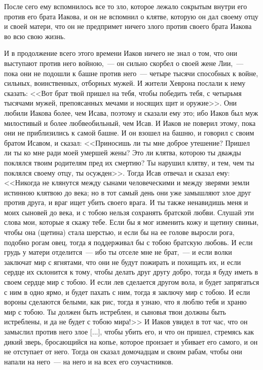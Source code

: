 После сего ему вспомнилось все то зло, которое
лежало сокрытым внутри его против его брата
Иакова, и он не вспомнил о клятве, которую он дал
своему отцу и своей матери, что он не предпримет
ничего злого против своего брата Иакова во всю
свою жизнь.

И в продолжение всего этого времени Иаков
ничего не знал о том, что они выступают против
него войною,~--- он сильно скорбел о своей жене Лии,~---
пока они не подошли к башне против него~--- четыре
тысячи способных к войне, сильных, воинственных,
отборных мужей. И жители Хеврона послали к нему
сказать: <<Вот брат твой пришел на тебя, чтобы
победить тебя, с четырьмя тысячами мужей,
препоясанных мечами и носящих щит и оружие>>.
Они любили Иакова более, чем Исава, поэтому и
сказали ему это; ибо Иаков был муж милостивый и
более любвеобильный, чем Исав. И Иаков не поверил
этому, пока они не приблизились к самой башне. И
он взошел на башню, и говорил с своим братом
Исавом, и сказал: <<Приносишь ли ты мне доброе
утешение? Пришел ли ты ко мне ради моей умершей
жены? Это ли клятва, которою ты дважды поклялся
твоим родителям пред их смертию? Ты нарушил
клятву, и тем, чем ты поклялся своему отцу, ты
осужден>>. Тогда Исав отвечал и сказал ему:
<<Никогда не клянутся между сынами
человеческими и между зверями земли истинною
клятвою до века; но в тот самый день они уже
замышляют злое друг против друга, и враг ищет
убить своего врага. И ты также ненавидишь меня и
моих сыновей до века, и с тобою нельзя сохранять братской
любви. Слушай эти слова мои, которые я скажу
тебе. Если бы я мог изменить кожу и щетину свиньи,
чтобы она (щетина) стала шерстью, и если бы на ее
голове выросли рога, подобно рогам овец, тогда я
поддерживал бы с тобою братскую любовь. И если
грудь у матери отделится~--- ибо ты отселе мне не
брат,~--- и если волки заключат мир с ягнятами, что
они не будут пожирать и похищать их, и если сердце
их склонится к тому, чтобы делать друг другу
добро, тогда я буду иметь в своем сердце мир с
тобою. И если лев сделается другом вола, и будет
запрягаться с ним в одно ярмо, и будет пахать с
ним, тогда я заключу мир с тобою. И если вороны
сделаются белыми, как рис, тогда я узнаю, что я
люблю тебя и храню мир с тобою. Ты должен быть
истреблен, и сыновья твои должны быть истреблены,
и да не будет с тобою мира!>> И Иаков увидел в тот
час, что он замыслил против него злое [...], чтобы
убить его, и что он пришел, стремясь как дикий
зверь, бросающийся на копье, которое пронзает и
убивает его самого, и он не отступает от него.
Тогда он сказал домочадцам и своим рабам, чтобы
они напали на него~--- на него и на всех его
соучастников.

